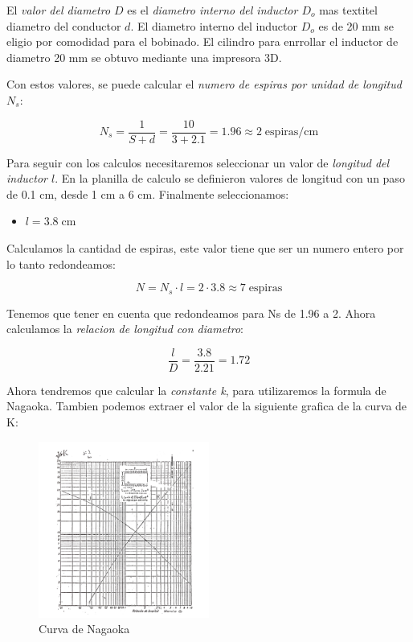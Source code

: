 El  \textit{valor del diametro $D$} es el \textit{ diametro interno del inductor $D_o$} mas textit{el diametro del conductor $d$}. El diametro interno del inductor $D_o$ es de 20 mm se eligio por comodidad para el bobinado.
El cilindro para enrrollar el inductor de diametro 20 mm se obtuvo mediante una impresora 3D.


Con estos valores, se puede calcular el \textit{numero de espiras por unidad de longitud $N_s$}:

\begin{equation}
    N_s = \frac{1}{S + d} = \frac{10}{3 + 2.1 } = 1.96 \approx 2 \; \text{espiras/cm}
\end{equation}

Para seguir con los calculos necesitaremos seleccionar un valor de \textit{longitud del inductor $l$}. En la planilla de calculo se definieron valores de longitud con un paso de 0.1 cm, desde 1 cm a 6 cm.
Finalmente seleccionamos:

\begin{itemize}
    \item $l = 3.8\; \text{cm}$
\end{itemize}

Calculamos la cantidad de espiras, este valor tiene que ser un numero entero por lo tanto redondeamos:

\begin{equation}
    N = N_s \cdot l = 2 \cdot 3.8 \approx 7\; \text{espiras} 
\end{equation}

Tenemos que tener en cuenta que redondeamos para Ns de 1.96 a 2. Ahora calculamos la \textit{relacion de longitud con diametro}:

\begin{equation}
    \frac{l}{D} = \frac{3.8}{2.21} = 1.72
\end{equation}

Ahora tendremos que calcular la \textit{constante k}, para utilizaremos la formula de Nagaoka. Tambien podemos extraer el valor de la siguiente grafica de la curva de K:

\begin{figure}[H]
    \centering
    \includegraphics[width=0.5\textwidth]{Imagenes/curva.png}
    \caption{Curva de Nagaoka}
\end{figure}

